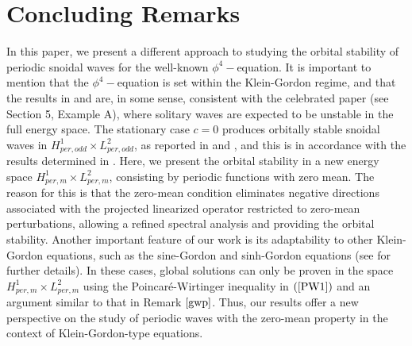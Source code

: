 \documentclass[12pt,reqno,a4paper]{amsart} %
\numberwithin{equation}{section}
\numberwithin{figure}{section}
\begin{document}
\section{Concluding Remarks} In this paper, we present a different approach to studying the orbital stability of periodic snoidal waves for the well-known $\phi^4-$equation. It is important to mention that the $\phi^4-$equation is set within the Klein-Gordon regime, and that the results in \cite{loreno} and \cite{palacios} are, in some sense, consistent with the celebrated paper \cite{grillakis1} (see Section 5, Example A), where solitary waves are expected to be unstable in the full energy space. The stationary case $c=0$ produces orbitally stable snoidal waves in $H_{per,odd}^1\times L_{per,odd}^2$, as reported in \cite{loreno} and \cite{palacios}, and this is in accordance with the results determined in \cite{martel}. Here, we present the orbital stability in a new energy space $H_{per,m}^1\times L_{per,m}^2$, consisting by periodic functions with zero mean. The reason for this is that the zero-mean condition eliminates negative directions associated with the projected linearized operator restricted to zero-mean perturbations, allowing a refined spectral analysis and providing the orbital stability. Another important feature of our work is its adaptability to other Klein-Gordon equations, such as the sine-Gordon and sinh-Gordon equations (see \cite{Natali2011} for further details). In these cases, global solutions can only be proven in the space $H_{per,m}^1\times L_{per,m}^2$ using the Poincaré-Wirtinger inequality in $(\ref{PW1})$ and an argument similar to that in Remark $\ref{gwp}$. Thus, our results offer a new perspective on the study of periodic waves with the zero-mean property in the context of Klein-Gordon-type equations.



\end{document}
